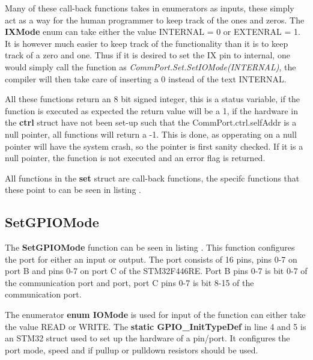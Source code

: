 Many of these call-back functions takes in enumerators as inputs, these simply act as a way for the human programmer to keep track of the ones and zeros. The \textbf{IXMode} enum can take either the value INTERNAL = 0 or EXTENRAL = 1. It is however much easier to keep track of the functionality than it is to keep track of a zero and one. Thus if it is desired to set the IX pin to internal, one would simply call the function as \textit{CommPort.Set.SetIOMode(INTERNAL)}, the compiler will then take care of inserting a 0 instead of the text INTERNAL. 

All these functions return an 8 bit signed integer, this is a status variable, if the function is executed as expected the return value will be a 1, if the hardware in the \textbf{ctrl} struct have not been set-up such that the CommPort.ctrl.selfAddr is a null pointer, all functions will return a -1. This is done, as opperating on a null pointer will have the system crash, so the pointer is first sanity checked. If it is a null pointer, the function is not executed and an error flag is returned.

All functions in the \textbf{set} struct are call-back functions, the specifc functions that these point to can be seen in listing .


\subsection*{SetGPIOMode}
The \textbf{SetGPIOMode} function can be seen in listing . This function configures the port for either an input or output. The port consists of 16 pins, pins 0-7 on port B and pins 0-7 on port C of the STM32F446RE. Port B pins 0-7 is bit 0-7 of the communication port and port, port C pins 0-7 is bit 8-15 of the communication port.


The enumerator \textbf{enum IOMode} is used for input of the function can either take the value READ or WRITE. The \textbf{static GPIO\_InitTypeDef} in line 4 and 5 is an STM32 struct used to set up the hardware of a pin/port. It configures the port mode, speed and if pullup or pulldown resistors should be used.

